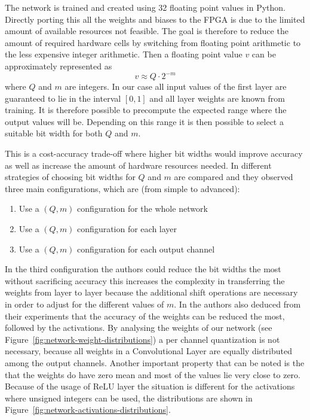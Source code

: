 The network is trained and created using \SI{32}{\bit} floating point values in Python. Directly porting this all the weights and biases to the FPGA is due to the limited amount of available resources not feasible. The goal is therefore to reduce the amount of required hardware cells by switching from floating point arithmetic to the less expensive integer arithmetic. Then a floating point value $v$ can be approximately represented as 
\begin{equation}
	v \approx Q \cdot 2 ^{-m}
\end{equation}
where $Q$ and $m$ are integers. In our case all input values of the first layer are guaranteed to lie in the interval $[0,1]$ and all layer weights are known from training. It is therefore possible to precompute the expected range where the output values will be. Depending on this range it is then possible to select a suitable bit width for both $Q$ and $m$.

This is a cost-accuracy trade-off where higher bit widths would improve accuracy as well as increase the amount of hardware resources needed.
In \cite{Wu:2018aa} different strategies of choosing bit widths for $Q$ and $m$ are compared and they observed three main configurations, which are (from simple to advanced):
\begin{enumerate}
	\item Use a $(Q,m)$ configuration for the whole network
	\item Use a $(Q,m)$ configuration for each layer
	\item Use a $(Q,m)$ configuration for each output channel 
\end{enumerate}
In the third configuration the authors could reduce the bit widths the most without sacrificing accuracy this increases the complexity in transferring the weights from layer to layer because the additional shift operations are necessary in order to adjust for the different values of $m$.
In \cite{Wu:2018aa} the authors also deduced from their experiments that the accuracy of the weights can be reduced the most, followed by the activations. By analysing the weights of our network (see Figure~\ref{fig:network-weight-distributions}) a per channel quantization is not necessary, because all weights in a Convolutional Layer are equally distributed among the output channels. Another important property that can be noted is the that the weights do have zero mean and most of the values lie very close to zero. Because of the usage of ReLU layer the situation is different for the activations where unsigned integers can be used, the distributions are shown in Figure~\ref{fig:network-activations-distributions}.

